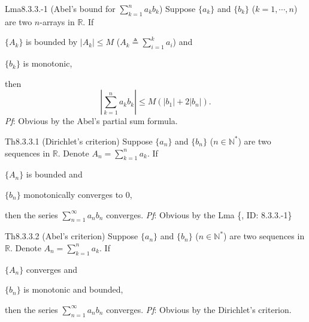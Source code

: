 \documentclass{article}
\begin{document}
\begin{Th}{Lma8.3.3.-1 (Abel's bound for $\sum_{k=1}^{n} a_k b_k$)}
    Suppose $\{a_k\}$ and $\{b_k\}$ ($k=1,\cdots,n$) are two $n$-arrays in $\mathbb{R}$. If
    \begin{compactenum}
        \item $\{A_k\}$ is bounded by $|A_k|\leq M$ ($A_k\triangleq \sum_{i=1}^{k} a_i$) and
        \item $\{b_k\}$ is monotonic,
    \end{compactenum}
    then
    $$ \left|\sum_{k=1}^{n} a_k b_k\right| \leq M(|b_1|+2|b_n|). $$
    \tcblower
    \textit{Pf}: Obvious by the Abel's partial sum formula.
\end{Th}

\begin{Th}{Th8.3.3.1 (Dirichlet's criterion)}
    Suppose $\{a_n\}$ and $\{b_n\}$ ($n\in\mathbb{N}^\ast$) are two sequences in $\mathbb{R}$. Denote $A_n = \sum_{k=1}^{n} a_k$. If
    \begin{compactenum}
        \item $\{A_n\}$ is bounded and
        \item $\{b_n\}$ monotonically converges to $0$,
    \end{compactenum}
    then the series $\sum_{n=1}^{\infty} a_n b_n$ converges.
    \tcblower
    \textit{Pf}: Obvious by the Lma \{, ID: 8.3.3.-1\}
\end{Th}

\begin{Th}{Th8.3.3.2 (Abel's criterion)}
    Suppose $\{a_n\}$ and $\{b_n\}$ ($n\in\mathbb{N}^\ast$) are two sequences in $\mathbb{R}$. Denote $A_n = \sum_{k=1}^{n} a_k$. If
    \begin{compactenum}
        \item $\{A_n\}$ converges and
        \item $\{b_n\}$ is monotonic and bounded,
    \end{compactenum}
    then the series $\sum_{n=1}^{\infty} a_n b_n$ converges.
    \tcblower
    \textit{Pf}: Obvious by the Dirichlet's criterion.
\end{Th}
\end{document}

